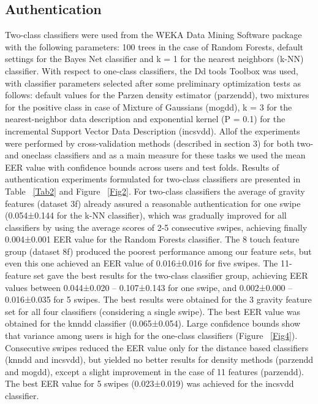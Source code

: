 \documentclass[referee]{raa}            %
\begin{document}
\subsection{Authentication}
Two-class classifiers were used from the WEKA Data Mining Software package with the following parameters: 100 trees in the case of Random Forests, default settings for the Bayes Net classifier and k = 1 for the nearest neighbors (k-NN) classifier. With respect to one-class classifiers, the Dd tools Toolbox was used, with classifier parameters selected after some preliminary optimization tests as follows: default values for the Parzen density estimator (parzendd), two mixtures for the positive class in case of Mixture of Gaussians (mogdd), k = 3 for the nearest-neighbor data description and exponential kernel (P = 0.1) for the incremental Support Vector Data Description (incsvdd). Allof the experiments were performed by cross-validation methods (described in section 3) for both two- and oneclass classifiers and as a main measure for these tasks we used the mean EER value with confidence bounds across users and test folds. Results of authentication experiments formulated for two-class classifiers are presented in Table ~\eqref{Tab2} and Figure ~\eqref{Fig2}. For two-class classifiers the average of gravity features (dataset 3f) already assured a reasonable authentication for one swipe (0.054±0.144 for the k-NN classifier), which was gradually improved for all classifiers by using the average scores of 2-5 consecutive swipes, achieving finally 0.004±0.001 EER value for the Random Forests classifier. The 8 touch feature group (dataset 8f) produced the poorest performance among our feature sets, but even this one achieved an EER value of 0.016±0.016 for five swipes. The 11-feature set gave the best results for the two-class classifier group, achieving EER values between 0.044±0.020 – 0.107±0.143 for one swipe, and 0.002±0.000 – 0.016±0.035 for 5 swipes. The best results were obtained for the 3 gravity feature set for all four classifiers (considering a single swipe). The best EER value was obtained for the knndd classifier (0.065±0.054). Large confidence bounds show that variance among users is high for the one-class classifiers (Figure ~\eqref{Fig4}). Consecutive swipes reduced the EER value only for the distance based classifiers (knndd and incsvdd), but yielded no better results for density methods (parzendd and mogdd), except a slight improvement in the case of 11 features (parzendd). The best EER value for 5 swipes (0.023±0.019) was achieved for the incsvdd classifier.
\par
\end{document}
